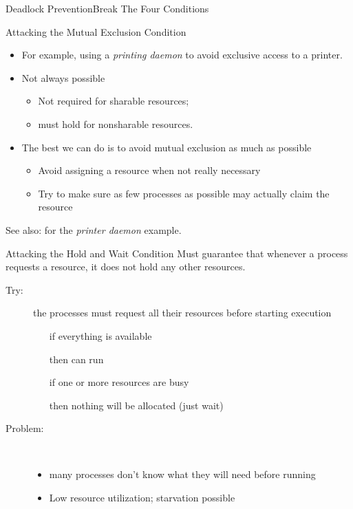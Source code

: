 \begin{frame}{Deadlock Prevention}{Break The Four Conditions}
  \begin{block}{Attacking the Mutual Exclusion Condition}
    \begin{itemize}
    \item For example, using a \emph{printing daemon} to avoid exclusive access to a printer.
    \item Not always possible
      \begin{itemize}
      \item Not required for sharable resources;
      \item must hold for nonsharable resources.
      \end{itemize}
    \item The best we can do is to avoid mutual exclusion as much as possible
      \begin{itemize}
      \item Avoid assigning a resource when not really necessary
      \item Try to make sure as few processes as possible may actually claim the resource
      \end{itemize}
    \end{itemize}
  \end{block}
\end{frame}

See also:  for the \emph{printer daemon} example.

\begin{frame}
  \begin{block}{Attacking the Hold and Wait Condition}
    Must guarantee that whenever a process requests a resource, it does not hold any other
    resources.
    \begin{description}
    \item[Try:] the processes must request all their resources before starting
      execution
      \begin{itemize}
      \item[if] everything is available
      \item[then] can run
      \item[if] one or more resources are busy
      \item[then] nothing will be allocated (just wait)
      \end{itemize}
    \item[Problem:] \ 
      \begin{itemize}
      \item many processes don't know what they will need before running
      \item Low resource utilization; starvation possible
      \end{itemize}
    \end{description}
  \end{block}
\end{frame}

